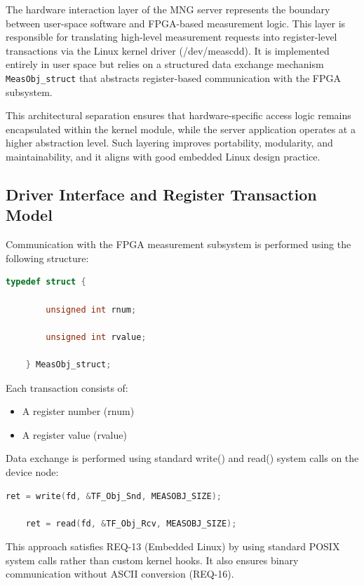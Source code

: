 The hardware interaction layer of the MNG server represents the boundary between user-space software and FPGA-based measurement logic. This layer is responsible for translating high-level measurement requests into register-level transactions via the Linux kernel driver (/dev/meascdd). It is implemented entirely in user space but relies on a structured data exchange mechanism \texttt{MeasObj\_struct} that abstracts register-based communication with the FPGA subsystem.

This architectural separation ensures that hardware-specific access logic remains encapsulated within the kernel module, while the server application operates at a higher abstraction level. Such layering improves portability, modularity, and maintainability, and it aligns with good embedded Linux design practice.

\subsection{Driver Interface and Register Transaction Model}

Communication with the FPGA measurement subsystem is performed using the following structure:

\begin{lstlisting}[language=C]
	typedef struct {
		
		unsigned int rnum;
		
		unsigned int rvalue;
		
	} MeasObj_struct;
\end{lstlisting}

Each transaction consists of:

\begin{itemize}
	\item A register number (rnum)
	\item A register value (rvalue)
\end{itemize}

Data exchange is performed using standard write() and read() system calls on the device node:

\begin{lstlisting}[language=C]
	ret = write(fd, &TF_Obj_Snd, MEASOBJ_SIZE);
	
	ret = read(fd, &TF_Obj_Rcv, MEASOBJ_SIZE);
\end{lstlisting}

This approach satisfies REQ-13 (Embedded Linux) by using standard POSIX system calls rather than custom kernel hooks. It also ensures binary communication without ASCII conversion (REQ-16).

